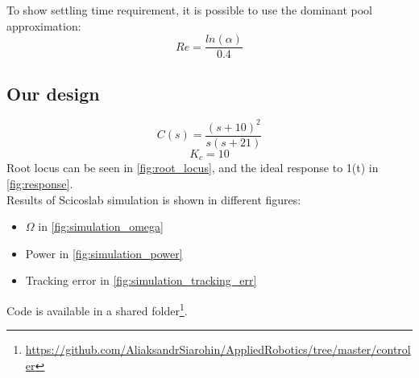 \documentclass[a4paper,12pt,oneside]{article}
\begin{document}
To show settling time requirement, it is possible to use the dominant pool approximation:
\begin{equation}
Re = \frac{ln(\alpha)}{0.4}
\end{equation}

\subsection{Our design}
\begin{equation}
C(s) = \frac{(s+10)^2}{s(s+21)}
\end{equation}
\begin{equation}
K_c = 10
\end{equation}
Root locus can be seen in \cref{fig:root_locus}, and the ideal response to 1(t) in \cref{fig:response}.\\ Results of Scicoslab simulation is shown in different figures:
\begin{itemize}
\item $\Omega$ in \cref{fig:simulation_omega}
\item Power in \cref{fig:simulation_power}
\item Tracking error in \cref{fig:simulation_tracking_err}
\end{itemize}
Code is available in a shared folder\footnote{\url{https://github.com/AliaksandrSiarohin/AppliedRobotics/tree/master/controler}}.
\end{document}
